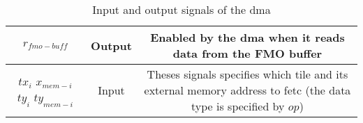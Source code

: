 \begin{table}[H]
\begin{tabular}{c|c|c}
        \hline
        $r_{fmo-buff}$ & Output & \makecell{Enabled by the \acrshort{dma} when it reads\\ data from the FMO buffer}\\
        \hline
        \makecell{$tx_{i}$\\$x_{mem-i}$\\$ty_{i}$\\$ty_{mem-i}$} & Input & \makecell{Theses signals specifies which tile \\ and its external memory address to fetc \\ (the data type is specified by $op$)}\\
        \hline \hline
    \end{tabular}
    \caption{Input and output signals of the \acrshort{dma}}
    \label{tab:dma_sig}
\end{table}
\newpage
